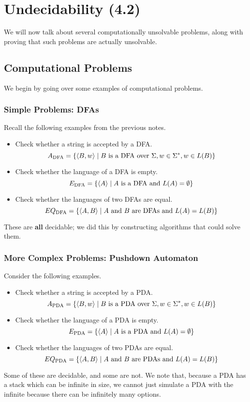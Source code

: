 \documentclass[letterpaper]{article}
\begin{document}
\section{Undecidability (4.2)} 
We will now talk about several computationally unsolvable problems, along with proving that such problems are actually unsolvable.

\subsection{Computational Problems}
We begin by going over some examples of computational problems. 

\subsubsection{Simple Problems: DFAs}
Recall the following examples from the previous notes. 
\begin{itemize}
    \item Check whether a string is accepted by a DFA. 
    \[A_{\text{DFA}} = \{\langle B, w \rangle \mid B \text{ is a DFA over } \Sigma, w \in \Sigma^*, w \in L(B)\}\]

    \item Check whether the language of a DFA is empty. 
    \[E_{\text{DFA}} = \{\langle A \rangle \mid A \text{ is a DFA and } L(A) = \emptyset\}\]
    
    \item Check whether the languages of two DFAs are equal.
    \[EQ_{\text{DFA}} = \{\langle A, B \rangle \mid A \text{ and } B \text{ are DFAs and } L(A) = L(B)\}\]
\end{itemize}
These are \textbf{all} decidable; we did this by constructing algorithms that could solve them. 

\subsubsection{More Complex Problems: Pushdown Automaton}
Consider the following examples.
\begin{itemize}
    \item Check whether a string is accepted by a PDA. 
    \[A_{\text{PDA}} = \{\langle B, w \rangle \mid B \text{ is a PDA over } \Sigma, w \in \Sigma^*, w \in L(B)\}\]

    \item Check whether the language of a PDA is empty. 
    \[E_{\text{PDA}} = \{\langle A \rangle \mid A \text{ is a PDA and } L(A) = \emptyset\}\]
    
    \item Check whether the languages of two PDAs are equal.
    \[EQ_{\text{PDA}} = \{\langle A, B \rangle \mid A \text{ and } B \text{ are PDAs and } L(A) = L(B)\}\]
\end{itemize}
Some of these are decidable, and some are not. We note that, because a PDA has a stack which can be infinite in size, we cannot just simulate a PDA with the infinite because there can be infinitely many options. 
\end{document}
